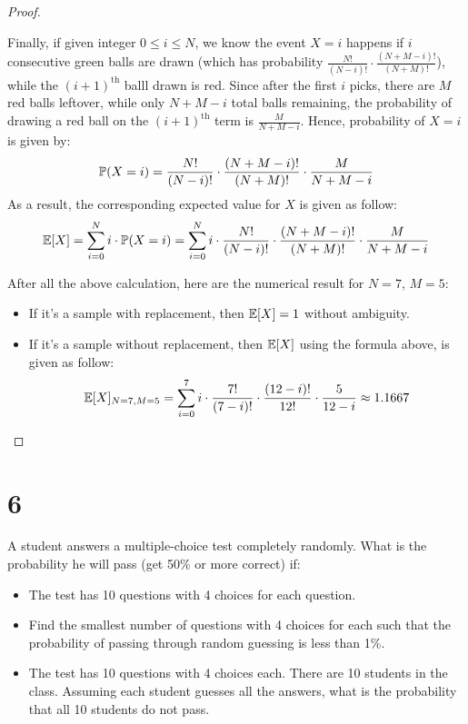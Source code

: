 \documentclass{article}
\begin{document}
\begin{proof}
\begin{itemize}
        \vspace{0.7em}

        Finally, if given integer $0\leq i\leq N$, we know the event $X=i$ happens if $i$ consecutive green balls are drawn (which has probability $\frac{N!}{(N-i)!}\cdot \frac{(N+M-i)!}{(N+M)!}$), while the $(i+1)^\text{th}$ balll drawn is red. Since after the first $i$ picks, there are $M$ red balls leftover, while only $N+M-i$ total balls remaining, the probability of drawing a red ball on the $(i+1)^\text{th}$ term is $\frac{M}{N+M-i}$. Hence, probability of $X=i$ is given by:
        \begin{align}
            \mathbb{P}(X=i)=\frac{N!}{(N-i)!}\cdot\frac{(N+M-i)!}{(N+M)!}\cdot \frac{M}{N+M-i}
        \end{align}
        As a result, the corresponding expected value for $X$ is given as follow:
        \begin{align}
            \mathbb{E}[X] = \sum_{i=0}^{N}i\cdot \mathbb{P}(X=i) = \sum_{i=0}^{N}i\cdot \frac{N!}{(N-i)!}\cdot\frac{(N+M-i)!}{(N+M)!}\cdot \frac{M}{N+M-i}
        \end{align}
    \end{itemize}

    After all the above calculation, here are the numerical result for $N=7$, $M=5$:
    \begin{itemize}
        \item[a)] If it's a sample with replacement, then $\mathbb{E}[X] = 1$ without ambiguity.
        \item[b)] If it's a sample without replacement, then $\mathbb{E}[X]$ using the formula above, is given as follow:
        \begin{align}
            \mathbb{E}[X]_{N=7, M=5} = \sum_{i=0}^{7}i\cdot \frac{7!}{(7-i)!}\cdot\frac{(12-i)!}{12!}\cdot\frac{5}{12-i} \approx 1.1667
        \end{align}
    \end{itemize}
\end{proof}

\newpage
\section*{6}
\begin{ques}\label{q6}
    A student answers a multiple-choice test completely randomly. What is the probability he will pass (get 50\% or more correct) if:
    \begin{itemize}
        \item[a)] The test has 10 questions with 4 choices for each question.
        \item[b)] Find the smallest number of questions with 4 choices for each such that the probability of passing through random guessing is less than 1\%.
        \item[c)] The test has 10 questions with 4 choices each. There are 10 students in the class. Assuming each student guesses all the answers, what is the probability that all 10 students do not pass.  
    \end{itemize}
\end{ques}
\end{document}
